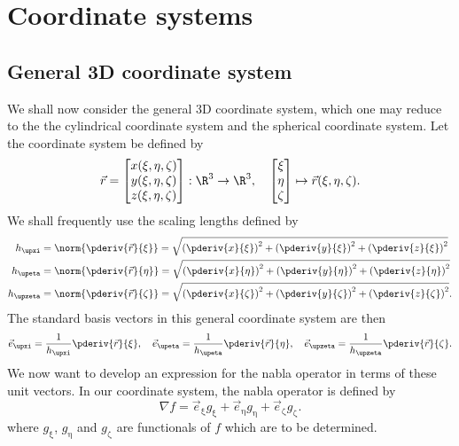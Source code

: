 \section{Coordinate systems}


\subsection{General 3D coordinate system}
\label{Sec2:general3DcoordinateSystem}
We shall now consider the general 3D coordinate system, which one may reduce to the the cylindrical coordinate system and the spherical coordinate system. Let the coordinate system be defined by
\begin{equation*}
	\vec{r} = \begin{bmatrix}
	x(\xi, \eta, \zeta)\\
	y(\xi, \eta, \zeta)\\
	z(\xi, \eta, \zeta)
\end{bmatrix} :	 \R^3\to\R^3, \quad  \begin{bmatrix}
	\xi\\
	\eta\\
	\zeta
	\end{bmatrix}\mapsto \vec{r}(\xi, \eta, \zeta).
\end{equation*}
We shall frequently use the scaling lengths defined by
\begin{align}
	h_{\upxi} &= \norm{\pderiv{\vec{r}}{\xi}} = \sqrt{\left(\pderiv{x}{\xi}\right)^2+\left(\pderiv{y}{\xi}\right)^2+\left(\pderiv{z}{\xi}\right)^2}\nonumber\\
	h_{\upeta} &= \norm{\pderiv{\vec{r}}{\eta}} = \sqrt{\left(\pderiv{x}{\eta}\right)^2+\left(\pderiv{y}{\eta}\right)^2+\left(\pderiv{z}{\eta}\right)^2}\label{Eq2:ScalingLengths}\\
	h_{\upzeta} &= \norm{\pderiv{\vec{r}}{\zeta}} = \sqrt{\left(\pderiv{x}{\zeta}\right)^2+\left(\pderiv{y}{\zeta}\right)^2+\left(\pderiv{z}{\zeta}\right)^2}.\nonumber
\end{align}
The standard basis vectors in this general coordinate system are then
\begin{equation*}
	\vec{e}_{\upxi} = \frac{1}{h_{\upxi}}\pderiv{\vec{r}}{\xi},\quad\vec{e}_{\upeta} = \frac{1}{h_{\upeta}}\pderiv{\vec{r}}{\eta},\quad\vec{e}_{\upzeta} = \frac{1}{h_{\upzeta}}\pderiv{\vec{r}}{\zeta}.
\end{equation*}
We now want to develop an expression for the nabla operator in terms of these unit vectors. In our coordinate system, the nabla operator is defined by
\begin{equation*}
	\nabla f = \vec{e}_{\upxi} g_{\upxi} +\vec{e}_{\upeta} g_{\upeta} +\vec{e}_{\upzeta} g_{\upzeta}.
\end{equation*}
where $g_{\upxi}$, $g_{\upeta}$ and $g_{\upzeta}$ are functionals of $f$ which are to be determined.

